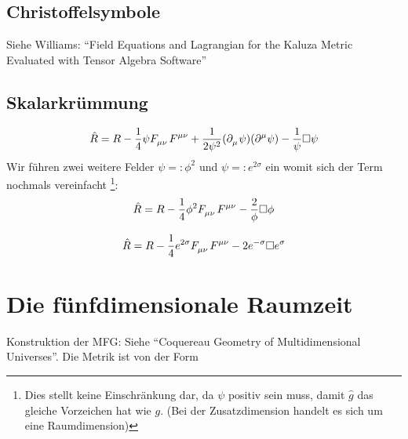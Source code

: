 \subsection{Christoffelsymbole}
Siehe Williams: "`Field Equations and Lagrangian for the Kaluza Metric
Evaluated with Tensor Algebra Software"'\cite{williams2015field}
\subsection{Skalarkrümmung}
\begin{equation}
\hat{R}=R-\frac{1}{4}\psi\tensor{F}{_\mu_\nu}\tensor{F}{^\mu^\nu}
+\frac{1}{2\psi^2}(\pdif{_\mu}\psi)(\pdif{^\mu}\psi)
-\frac{1}{\psi}\square\psi
\end{equation}
Wir führen zwei weitere Felder $\psi=:\phi^2$ und $\psi=:e^{2\sigma}$ ein womit
sich der Term nochmals vereinfacht \footnote{Dies stellt keine Einschränkung
dar, da $\psi$ positiv sein muss, damit $\hat{g}$ das gleiche Vorzeichen hat wie $g$. (Bei der Zusatzdimension handelt es sich um
eine Raumdimension)}:
\begin{equation}
\hat{R}=R-\frac{1}{4}\phi^2\tensor{F}{_\mu_\nu}\tensor{F}{^\mu^\nu}
-\frac{2}{\phi}\square \phi
\end{equation}

\begin{equation}
\hat{R}=R-\frac{1}{4}e^{2\sigma}\tensor{F}{_\mu_\nu}\tensor{F}{^\mu^\nu}
-2e^{-\sigma}\square e^{\sigma}
\end{equation}

\section{Die fünfdimensionale Raumzeit}
Konstruktion der MFG: Siehe "`Coquereau Geometry of Multidimensional
Universes"'\cite{coquereaux1983geometry}.
Die Metrik ist von der Form
